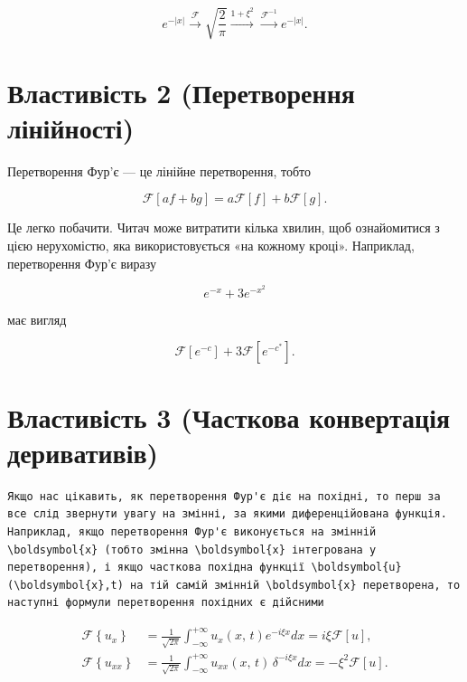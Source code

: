 \documentclass[
  ukrainian,
]{article}
\begin{document}
\[
e^{-|x|} \xrightarrow{\mathcal{F}} \sqrt{\frac{2}{\pi}} \xrightarrow{1 + \xi^2} \xrightarrow{\mathcal{F}^{-1}} e^{-|x|}.
\]

\section{Властивість 2 (Перетворення
лінійності)}\label{ux432ux43bux430ux441ux442ux438ux432ux456ux441ux442ux44c-2-ux43fux435ux440ux435ux442ux432ux43eux440ux435ux43dux43dux44f-ux43bux456ux43dux456ux439ux43dux43eux441ux442ux456}

Перетворення Фур'є --- це лінійне перетворення, тобто

\[
\mathscr{F}[af+bg]=a\mathscr{F}[f]+b\mathscr{F}[g].
\]

Це легко побачити. Читач може витратити кілька хвилин, щоб ознайомитися
з цією нерухомістю, яка використовується «на кожному кроці». Наприклад,
перетворення Фур'є виразу

\[
e^{-x} + 3e^{-x^2}
\]

має вигляд

\[
\mathscr{F}[e^{-c}] + 3\mathscr{F}[e^{-c^*}].
\]

\section{Властивість 3 (Часткова конвертація
деривативів)}\label{ux432ux43bux430ux441ux442ux438ux432ux456ux441ux442ux44c-3-ux447ux430ux441ux442ux43aux43eux432ux430-ux43aux43eux43dux432ux435ux440ux442ux430ux446ux456ux44f-ux434ux435ux440ux438ux432ux430ux442ux438ux432ux456ux432}

\begin{verbatim}
Якщо нас цікавить, як перетворення Фур'є діє на похідні, то перш за все слід звернути увагу на змінні, за якими диференційована функція. Наприклад, якщо перетворення Фур'є виконується на змінній \boldsymbol{x} (тобто змінна \boldsymbol{x} інтегрована у перетворення), і якщо часткова похідна функції \boldsymbol{u}(\boldsymbol{x},t) на тій самій змінній \boldsymbol{x} перетворена, то наступні формули перетворення похідних є дійсними
\end{verbatim}

\[
\begin{split} \mathcal{F}\left\{u_{x}\right\} &= \frac{1}{\sqrt{2\pi}} \int_{-\infty}^{+\infty} u_{x}\left(x,\,t\right) e^{-i\xi x} dx = i\xi \mathcal{F}\left[u\right], \\ \mathcal{F}\left\{u_{xx}\right\} &= \frac{1}{\sqrt{2\pi}} \int_{-\infty}^{+\infty} u_{xx}\left(x,\,t\right) \, \delta^{-i\xi x} dx = -\xi^{2} \mathcal{F}\left[u\right]. \end{split}
\]
\end{document}
